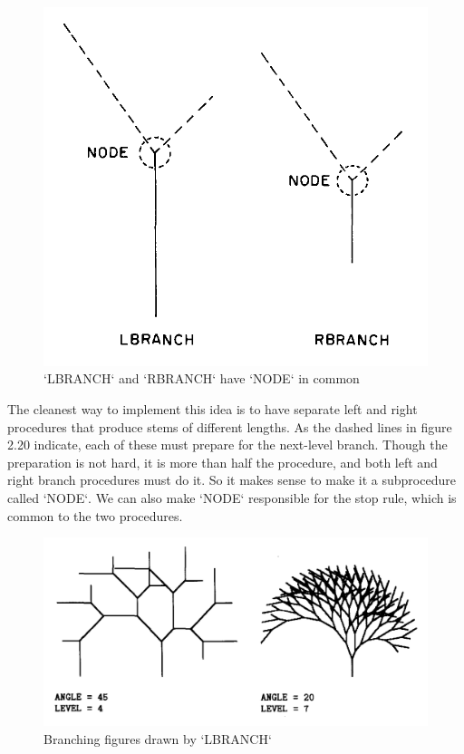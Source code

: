 \documentclass{book}
\begin{document}
\begin{figure}
\begin{center}
\includegraphics[scale=1]{fig2-20}
\caption{\textsc{`LBRANCH`} and \textsc{`RBRANCH`} have \textsc{`NODE`} in common}
\end{center}
\end{figure}

The cleanest way to implement this idea is to have separate left and
right procedures that produce stems of different lengths. As the dashed
lines in figure 2.20 indicate, each of these must prepare for the next-level
branch. Though the preparation is not hard, it is more than half the
procedure, and both left and right branch procedures must do it. So
it makes sense to make it a subprocedure called \textsc{`NODE`}. We can also
make \textsc{`NODE`} responsible for the stop rule, which is common to the two
procedures.

\begin{figure}
\begin{center}
\includegraphics[scale=1]{fig2-21}
\caption{Branching figures drawn by \textsc{`LBRANCH`}}
\end{center}
\end{figure}
\end{document}
